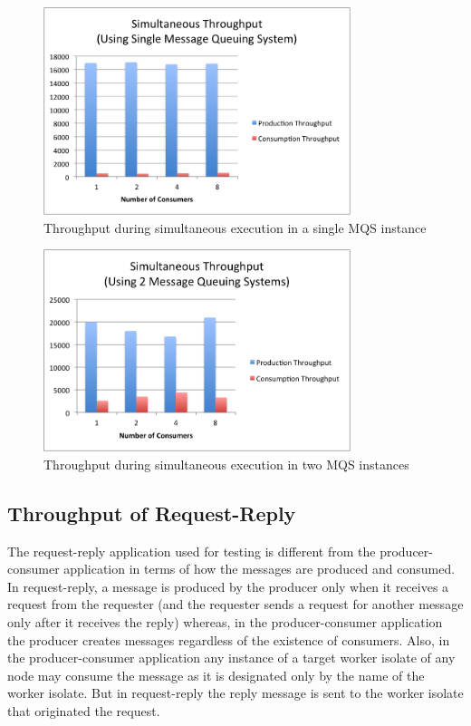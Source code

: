 \begin{figure}[H]
  \centering
  \includegraphics[width=0.8\textwidth]{figures/07simultaneous1}
  \caption[Throughput during simultaneous execution in single MQS]{Throughput during simultaneous execution in a single MQS instance}
  \label{fig:result-simultaneous1}
\end{figure}

\begin{figure}[H]
  \centering
  \includegraphics[width=0.8\textwidth]{figures/08simultaneous2}
  \caption[Throughput during simultaneous execution in two MQS]{Throughput during simultaneous execution in two MQS instances}
  \label{fig:result-simultaneous2}
\end{figure}


\subsection{Throughput of Request-Reply}
\label{subsec:request-reply}
  The request-reply application used for testing is different from the producer-consumer application in terms of how the messages are produced and consumed. In request-reply, a message is produced by the producer only when it receives a request from the requester (and the requester sends a request for another message only after it receives the reply) whereas, in the producer-consumer application the producer creates messages regardless of the existence of consumers. Also, in the producer-consumer application any instance of a target worker isolate of any node may consume the message as it is designated only by the name of the worker isolate. But in request-reply the reply message is sent to the worker isolate that originated the request.

